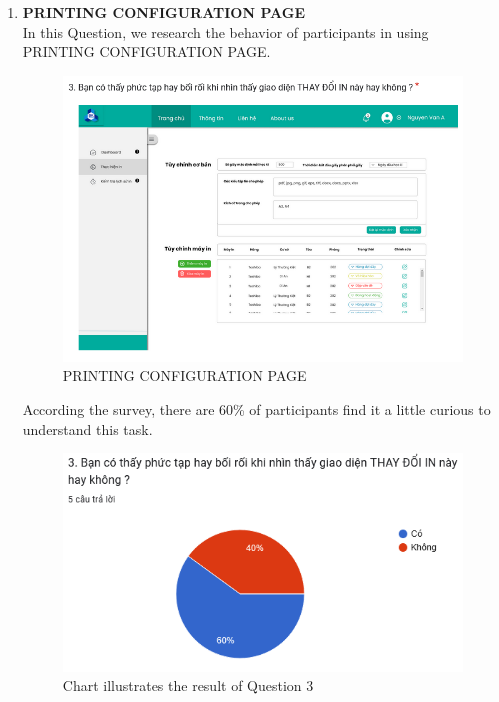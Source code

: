 \documentclass[a4paper]{report}
\begin{document}
\begin{enumerate}
    \item \textbf{PRINTING CONFIGURATION PAGE} \\
    In this Question, we research the behavior of participants in using PRINTING CONFIGURATION PAGE.
\begin{figure}[!h]
    \centering
    \includegraphics[width=0.8\linewidth]{images/image_uasbility/Q3_SPSO.png}
    \caption{PRINTING CONFIGURATION PAGE}
    \label{fig:PRINTING CONFIGURATION}
\end{figure}
\newpage
According the survey, there are 60\% of participants find it a little curious to understand this task.
\begin{figure}[!h]
    \centering
    \includegraphics[width=0.8\linewidth]{images/image_uasbility/A3_SPSO.png}
    \caption{Chart illustrates the result of Question 3}
    \label{fig:Chart illustrates the result of Question 3}
\end{figure}



\end{enumerate}
\end{document}
